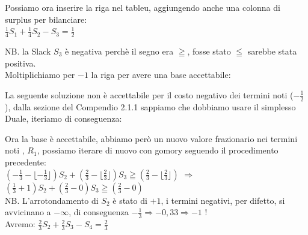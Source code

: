 \documentclass{article}
\begin{document}
Possiamo ora inserire la riga nel tableu, aggiungendo anche una colonna di surplus per bilanciare:\\

$\frac{1}{4}S_1 + \frac{1}{4}S_2 -S_3 = \frac{1}{2}$

NB. la Slack $S_3$ è negativa perchè il segno era $\geqq$, fosse stato $\leqq$ sarebbe stata positiva.\\
Moltiplichiamo per $-1$ la riga per avere una base accettabile:\\
\begin{center}
\end{center}

La seguente soluzione non è accettabile per il costo negativo dei termini noti ($-\frac{1}{2}$), dalla sezione del Compendio 2.1.1 sappiamo che dobbiamo usare il simplesso Duale, iteriamo di conseguenza:\\

\begin{center}
\end{center}

Ora la base è accettabile, abbiamo però un nuovo valore frazionario nei termini noti , $R_1$, possiamo iterare di nuovo con gomory seguendo il procedimento precedente:\\

$  ( -\frac{1}{3} - \lfloor - \frac{1}{3} \rfloor )S_2 +  ( \frac{2}{3} - \lfloor \frac{2}{3} \rfloor )S_3 \geqq ( \frac{2}{3} - \lfloor \frac{2}{3} \rfloor )$  $\Rightarrow$  $( \frac{1}{3} + 1 )S_2 +  ( \frac{2}{3} - 0 )S_3 \geqq ( \frac{2}{3} - 0 )$\\
NB. L'arrotondamento di $S_2$ è stato di $+1$, i termini negativi, per difetto, si avvicinano a $- \infty$, di conseguenza $- \frac{1}{3} \Rightarrow -0,33 \Rightarrow -1 $ !\\
Avremo: $\frac{2}{3}S_2 + \frac{2}{3}S_3 -S_4 = \frac{2}{3}$
\end{document}
